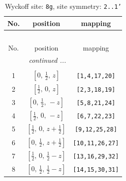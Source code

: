 \documentclass[fleqn,8pt]{jsarticle}
\begin{document}
\begin{longtable}{ccc}
\caption{Wyckoff site: {\tt 8g}, site symmetry: {\tt 2..1'}}
 \\
 \hline \hline
No. & position & mapping \\ \hline \endfirsthead

\multicolumn{2}{l}{\tablename\ \thetable{}} \\
 \hline \hline
No. & position & mapping \\ \hline \endhead

 \hline \hline
\multicolumn{2}{r}{\footnotesize\it continued ...} \\ \endfoot

 \hline \hline
\multicolumn{2}{r}{} \\ \endlastfoot

1 & $\left[ 0,\, \frac{1}{2},\, z \right]$ & {\tt [1,4,17,20]} \\ \hline
2 & $\left[ \frac{1}{2},\, 0,\, z \right]$ & {\tt [2,3,18,19]} \\ \hline
3 & $\left[ 0,\, \frac{1}{2},\, - z \right]$ & {\tt [5,8,21,24]} \\ \hline
4 & $\left[ \frac{1}{2},\, 0,\, - z \right]$ & {\tt [6,7,22,23]} \\ \hline
5 & $\left[ \frac{1}{2},\, 0,\, z + \frac{1}{2} \right]$ & {\tt [9,12,25,28]} \\ \hline
6 & $\left[ 0,\, \frac{1}{2},\, z + \frac{1}{2} \right]$ & {\tt [10,11,26,27]} \\ \hline
7 & $\left[ \frac{1}{2},\, 0,\, \frac{1}{2} - z \right]$ & {\tt [13,16,29,32]} \\ \hline
8 & $\left[ 0,\, \frac{1}{2},\, \frac{1}{2} - z \right]$ & {\tt [14,15,30,31]} \\
\end{longtable}
\renewcommand{\arraystretch}{1.2}
\end{document}
